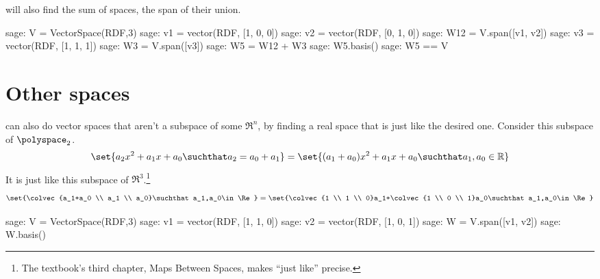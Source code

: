 \Sage{} will also find the sum of spaces, the span of their union.
\begin{sagecommandline}
sage: V = VectorSpace(RDF,3)
sage: v1 = vector(RDF, [1, 0, 0])
sage: v2 =  vector(RDF, [0, 1, 0])
sage: W12 = V.span([v1, v2])
sage: v3 = vector(RDF, [1, 1, 1])
sage: W3 = V.span([v3])
sage: W5 = W12 + W3
sage: W5.basis()
sage: W5 == V
\end{sagecommandline}






\section{Other spaces}

\Sage{} can also do vector spaces that aren't a subspace of some $\Re^n$,
by finding a real space that is just like the desired one.
Consider this subspace of 
$\polyspace_2$.
\begin{equation*}
  \set{ a_2x^2+a_1x+a_0\suchthat a_2=a_0+a_1}           
   =\set{ (a_1+a_0)x^2+a_1x+a_0 \suchthat a_1,a_0\in\Re}
\end{equation*}
It is just like
this subspace of $\Re^3$.\footnote{%
  The textbook's 
  third chapter, Maps Between Spaces, makes 
  ``just like'' precise.}
\begin{equation*}
  \set{\colvec{a_1+a_0 \\ a_1 \\ a_0}\suchthat a_1,a_0\in\Re}
  =\set{\colvec{1 \\ 1 \\ 0}a_1+\colvec{1 \\ 0 \\ 1}a_0\suchthat a_1,a_0\in\Re}
\end{equation*}
\begin{sagecommandline}
sage: V = VectorSpace(RDF,3)
sage: v1 = vector(RDF, [1, 1, 0])
sage: v2 = vector(RDF, [1, 0, 1])
sage: W = V.span([v1, v2])
sage: W.basis()
\end{sagecommandline}


